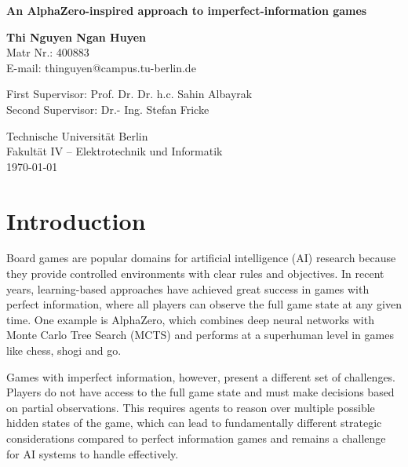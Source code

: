 \documentclass[12pt,oneside,openright]{article}
\newcommand{\topic}
{An AlphaZero-inspired approach to imperfect-information games}
\begin{document}
\date{\today}
\begin{center}
  \vspace*{1cm}
  \Huge
  \textbf{\topic}
  \LARGE

  \vspace{2cm}

  \textbf{Thi Nguyen Ngan Huyen}\\
  \vspace{0.5cm}
  \normalsize
  Matr Nr.: 400883\\
  E-mail: thinguyen@campus.tu-berlin.de
  \vspace{2cm}

  \large
  \begin{center}
    First Supervisor: Prof. Dr. Dr. h.c. Sahin Albayrak \\
    Second Supervisor: Dr.- Ing. Stefan Fricke
  \end{center}        \vspace{0.8cm}

  \Large
  Technische Universität Berlin\\
  Fakultät IV – Elektrotechnik und Informatik\\
  \vspace{1cm}
  \today
\end{center}
\newpage

\tableofcontents

\newpage

\section{Introduction}

Board games are popular domains for artificial intelligence (AI) research because they provide controlled environments with clear rules and objectives.
In recent years, learning-based approaches have achieved great success in games with perfect information, where all players can observe the full game state at any given time.
One example is AlphaZero, which combines deep neural networks with Monte Carlo Tree Search (MCTS) and performs at a superhuman level in games like chess, shogi and go\cite{Silver2017alphazero}.

Games with imperfect information, however, present a different set of challenges.
Players do not have access to the full game state and must make decisions based on partial observations.
This requires agents to reason over multiple possible hidden states of the game, which can lead to fundamentally different strategic considerations compared to perfect information games and remains a challenge for AI systems to handle effectively.
\end{document}
